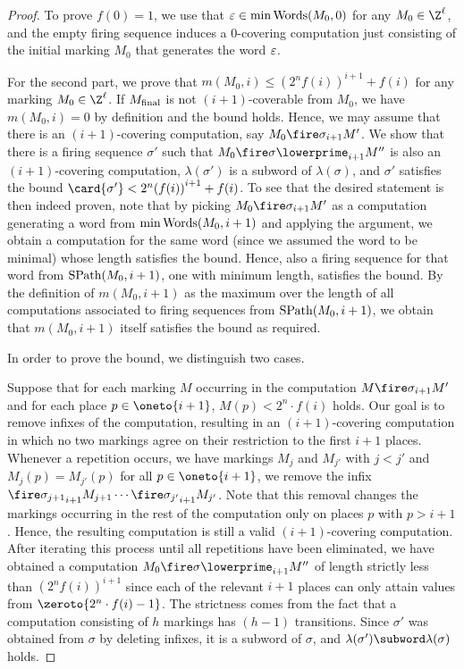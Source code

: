 \documentclass[../../diss.tex]{subfiles}
\begin{document}
\begin{proof}
    To prove $f(0) = 1$, we use that $\varepsilon \in \min \text{Words}(M_0,0)$ for any $M_0 \in \Z^{\ell}$, and the empty firing sequence induces a $0$-covering computation just consisting of the initial marking $M_0$ that generates the word $\varepsilon$.

    For the second part, we prove that $m(M_0,i) \leq {(2^n f(i))}^{i+1} + f(i)$ for any marking $M_0 \in \Z^\ell$.
    If $M_{\text{final}}$ is not $(i+1)$-coverable from $M_0$, we have $m(M_0,i) = 0$ by definition and the bound holds.
    Hence, we may assume that there is an $(i+1)$-covering computation, say $M_0 \fireipo{\sigma} M'$.
    We show that there is a firing sequence $\sigma'$ such that $M_0 \fireipo{\sigma\lowerprime} M''$ is also an $(i+1)$-covering computation, $\lambda(\sigma')$ is a subword of $\lambda(\sigma)$, and $\sigma'$ satisfies the bound $\card{\sigma'} < 2^n {(f(i))}^{i+1} + f(i)$.
    To see that the desired statement is then indeed proven, note that by picking $M_0 \fireipo{\sigma} M'$ as a computation generating a word from $\min \text{Words}(M_0,i+1)$ and applying the argument, we obtain a computation for the same word (since we assumed the word to be minimal) whose length satisfies the bound.
    Hence, also a firing sequence for that word from $\text{SPath}(M_0,i+1)$, \ie one with minimum length, satisfies the bound.
    By the definition of $m(M_0,i+1)$ as the maximum over the length of all computations associated to firing sequences from $\text{SPath}(M_0,i+1)$, we obtain that $m(M_0,i+1)$ itself satisfies the bound as required.


    In order to prove the bound, we distinguish two cases.

    Suppose that for each marking $M$ occurring in the computation $M \fireipo{\sigma} M'$ and for each place $p \in \oneto{i+1}$, $M(p) < 2^n \cdot f(i)$ holds.
    Our goal is to remove infixes of the computation, resulting in an $(i+1)$-covering computation in which no two markings agree on their restriction to the first $i+1$ places.
    Whenever a repetition occurs, \ie we have markings $M_j$ and $M_{j'}$ with $j < j'$ and $M_j (p) = M_{j'}(p)$ for all $p \in \oneto{i+1}$, we remove the infix $\fireipo{\sigma_{j+1}} M_{j+1} \cdots \fireipo{\sigma_{j'}} M_{j'}$.
    Note that this removal changes the markings occurring in the rest of the computation only on places $p$ with $p > i+1$.
    Hence, the resulting computation is still a valid $(i+1)$-covering computation.
    After iterating this process until all repetitions have been eliminated, we have obtained a computation $M_0 \fireipo{\sigma\lowerprime} M''$ of length strictly less than
    \(
        {(2^n f(i))}^{i+1}
    \)
    since each of the relevant $i+1$ places can only attain values from $\zeroto{2^n \cdot f(i) - 1}$.
    The strictness comes from the fact that a computation consisting of $h$ markings has $(h-1)$ transitions.
    Since $\sigma'$ was obtained from $\sigma$ by deleting infixes, it is a subword of $\sigma$, and $\lambda(\sigma') \subword \lambda(\sigma)$ holds.


\end{proof}
\end{document}
